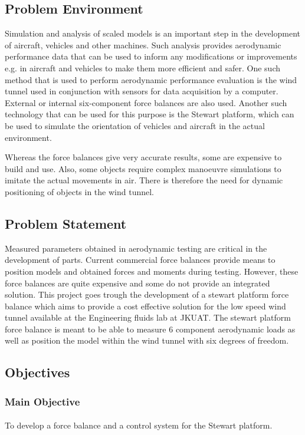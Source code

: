 \subsection{Problem Environment}
Simulation and analysis of scaled models is an important step in the development of aircraft, vehicles and other machines. Such analysis provides aerodynamic performance data that can be used to inform any modifications or improvements e.g. in aircraft and vehicles to make them more efficient and safer. One such method that is used to perform aerodynamic performance evaluation is the wind tunnel used in conjunction with sensors for data acquisition by a computer. External or internal six-component force balances are also used. Another such technology that can be used for this purpose is the Stewart platform, which can be used to simulate the
orientation of vehicles and aircraft in the actual environment.

Whereas the force balances give very accurate results, some are expensive to build and use. Also, some objects require complex manoeuvre simulations to imitate the actual movements in air. There is therefore the need for dynamic positioning of objects in the wind tunnel.
\subsection{Problem Statement}
Measured parameters obtained in aerodynamic testing are critical in the development of parts. Current commercial force balances provide means to position models and obtained forces and moments during testing.
However, these force balances are quite expensive and some do not provide an integrated solution. This project goes trough the development of a stewart platform force balance which aims to provide a cost effective solution for the low speed wind tunnel available at the Engineering fluids lab at JKUAT.
The stewart platform force balance is meant to be able to measure 6 component aerodynamic loads as well as position the model within the wind tunnel with six degrees of freedom.
\subsection{Objectives}
\subsubsection{Main Objective}
\paragraph{} To develop a force balance and a control system for the Stewart platform.
